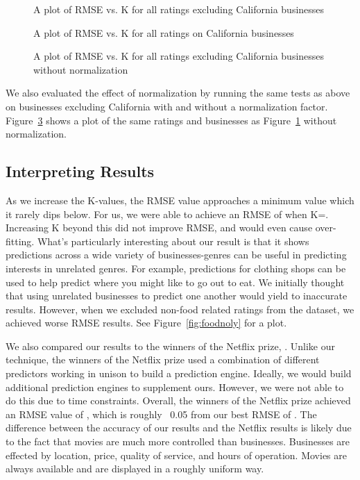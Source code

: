 \begin{figure}[ht!]
	\centering
	\caption[]{A plot of RMSE vs. K for all ratings excluding California businesses}
	\label{fig:nocal}
\end{figure}


\begin{figure}[ht!]
	\centering
	\caption[]{A plot of RMSE vs. K for all ratings on California businesses}
	\label{fig:cal}
\end{figure}

\begin{figure}[ht!]
	\centering
	\caption[]{A plot of RMSE vs. K for all ratings excluding California businesses without normalization}
	\label{fig:norm}
\end{figure}

We also evaluated the effect of normalization by running the same tests as above on businesses excluding California with and without a normalization factor. Figure~\ref{fig:norm} shows a plot of the same ratings and businesses as Figure~\ref{fig:nocal} without normalization.

\subsection{Interpreting Results}
As we increase the K-values, the RMSE value approaches a minimum value which it rarely dips below. For us, we were able to achieve an RMSE of \bestRMSE when K=\bestK. Increasing K beyond this did not improve RMSE, and would even cause over-fitting. What's particularly interesting about our result is that it shows predictions across a wide variety of businesses-genres can be useful in predicting interests in unrelated genres. For example, predictions for clothing shops can be used to help predict where you might like to go out to eat. We initially thought that using unrelated businesses to predict one another would yield to inaccurate results. However, when we excluded non-food related ratings from the dataset, we achieved worse RMSE results. See Figure~\ref{fig:foodnoly} for a plot.

We also compared our results to the winners of the Netflix prize, \cite{netprize}. Unlike our technique, the winners of the Netflix prize used a combination of different predictors working in unison to build a prediction engine. Ideally, we would build additional prediction engines to supplement ours. However, we were not able to do this due to time constraints. Overall, the winners of the Netflix prize achieved an RMSE value of \bestNetflixRMSE, which is roughly ~0.05 from our best RMSE of \bestRMSE. The difference between the accuracy of our results and the Netflix results is likely due to the fact that movies are much more controlled than businesses. Businesses are effected by location, price, quality of service, and hours of operation. Movies are always available and are displayed in a roughly uniform way. 

